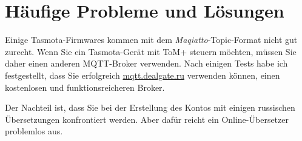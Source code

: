 \section{Häufige Probleme und Lösungen}

Einige Tasmota-Firmwares kommen mit dem \textit{Maqiatto}-Topic-Format nicht gut zurecht.
Wenn Sie ein Tasmota-Gerät mit ToM+ steuern möchten, müssen Sie daher einen anderen MQTT-Broker verwenden.
Nach einigen Tests habe ich festgestellt, dass Sie erfolgreich \href{https://dealgate.ru/}{mqtt.dealgate.ru}
verwenden können, einen kostenlosen und funktionsreicheren Broker.

Der Nachteil ist, dass Sie bei der Erstellung des Kontos mit einigen russischen Übersetzungen
konfrontiert werden.
Aber dafür reicht ein Online-Übersetzer problemlos aus.
